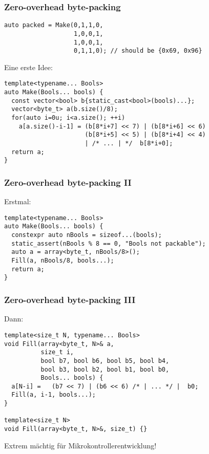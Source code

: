 \documentclass[t,ngerman,usepdftitle=false]{beamer}
\begin{document}
\begin{frame}[fragile]
  \frametitle{Zero-overhead byte-packing}
  \begin{lstlisting}
auto packed = Make(0,1,1,0,
                   1,0,0,1,	
                   1,0,0,1,
                   0,1,1,0); // should be {0x69, 0x96}
  \end{lstlisting}

\pause
Eine erste Idee:
\begin{lstlisting}
template<typename... Bools>
auto Make(Bools... bools) {
  const vector<bool> b{static_cast<bool>(bools)...};
  vector<byte_t> a(b.size()/8);
  for(auto i=0u; i<a.size(); ++i)
    a[a.size()-i-1] = (b[8*i+7] << 7) | (b[8*i+6] << 6) 
                      (b[8*i+5] << 5) | (b[8*i+4] << 4) 
                      | /* ... | */  b[8*i+0];
  return a;
}
\end{lstlisting}
  
\end{frame}

\begin{frame}[fragile]
  \frametitle{Zero-overhead byte-packing II}
  
Erstmal: 
\begin{lstlisting}
template<typename... Bools>
auto Make(Bools... bools) {
  constexpr auto nBools = sizeof...(bools);
  static_assert(nBools % 8 == 0, "Bools not packable");
  auto a = array<byte_t, nBools/8>();
  Fill(a, nBools/8, bools...);
  return a;
}
\end{lstlisting}

\end{frame}

\begin{frame}[fragile]
  \frametitle{Zero-overhead byte-packing III}

Dann:
\begin{lstlisting}
template<size_t N, typename... Bools>
void Fill(array<byte_t, N>& a,
          size_t i,
          bool b7, bool b6, bool b5, bool b4,
          bool b3, bool b2, bool b1, bool b0,
          Bools... bools) {
  a[N-i] =   (b7 << 7) | (b6 << 6) /* | ... */ |  b0;
  Fill(a, i-1, bools...);
}

template<size_t N>
void Fill(array<byte_t, N>&, size_t) {}
\end{lstlisting}

\begin{block}{}
  \centering Extrem mächtig für Mikrokontrollerentwicklung! 
\end{block}
    
\end{frame}
\end{document}
